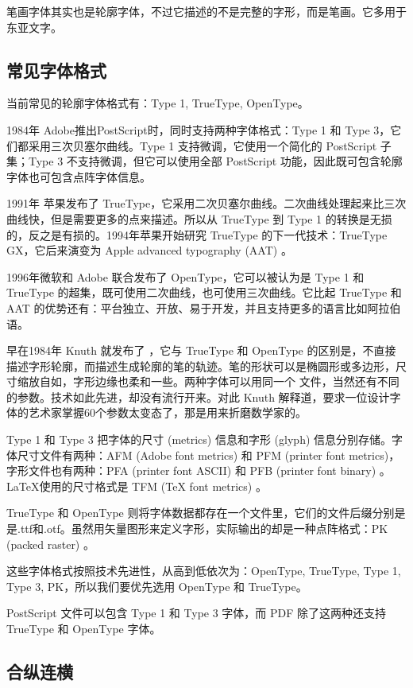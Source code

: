 笔画字体其实也是轮廓字体，不过它描述的不是完整的字形，而是笔画。它多用于东亚文字。

\subsection{常见字体格式}

当前常见的轮廓字体格式有：Type 1, TrueType, OpenType。

1984年 Adobe\indexAdobe 推出PostScript时，同时支持两种字体格式：Type 1 和 Type 3，它们都采用三次贝塞尔曲线。Type 1 支持微调，它使用一个简化的 PostScript 子集；Type 3 不支持微调，但它可以使用全部 PostScript 功能，因此既可包含轮廓字体也可包含点阵字体信息。

1991年 苹果\indexApple 发布了 TrueType，它采用二次贝塞尔曲线。二次曲线处理起来比三次曲线快，但是需要更多的点来描述。所以从 TrueType 到 Type 1 的转换是无损的，反之是有损的。1994年苹果开始研究 TrueType 的下一代技术：TrueType GX，它后来演变为 Apple advanced typography (AAT) 。

1996年微软和 Adobe 联合发布了 OpenType，它可以被认为是 Type 1 和 TrueType 的超集，既可使用二次曲线，也可使用三次曲线。它比起 TrueType 和 AAT 的优势还有：平台独立、开放、易于开发，并且支持更多的语言比如阿拉伯语。

早在1984年 Knuth 就发布了 \MF ，它与 TrueType 和 OpenType 的区别是，不直接描述字形轮廓，而描述生成轮廓的笔的轨迹。笔的形状可以是椭圆形或多边形，尺寸缩放自如，字形边缘也柔和一些。两种字体可以用同一个 \MF 文件，当然还有不同的参数。\MF 技术如此先进，却没有流行开来。对此 Knuth 解释道，要求一位设计字体的艺术家掌握60个参数太变态了，那是用来折磨数学家的。

Type 1 和 Type 3 把字体的尺寸 (metrics) 信息和字形 (glyph) 信息分别存储。字体尺寸文件有两种：AFM (Adobe font metrics) 和 PFM (printer font metrics)，字形文件也有两种：PFA (printer font ASCII) 和 PFB (printer font binary) 。\LaTeX 使用的尺寸格式是 TFM (TeX font metrics) 。

TrueType 和 OpenType 则将字体数据都存在一个文件里，它们的文件后缀分别是是.ttf和.otf。\MF 虽然用矢量图形来定义字形，实际输出的却是一种点阵格式：PK (packed raster) 。

这些字体格式按照技术先进性，从高到低依次为：OpenType, TrueType, Type 1, Type 3, PK，所以我们要优先选用 OpenType 和 TrueType。

PostScript 文件可以包含 Type 1 和 Type 3 字体，而 PDF 除了这两种还支持 TrueType 和 OpenType 字体。

\subsection{合纵连横}


